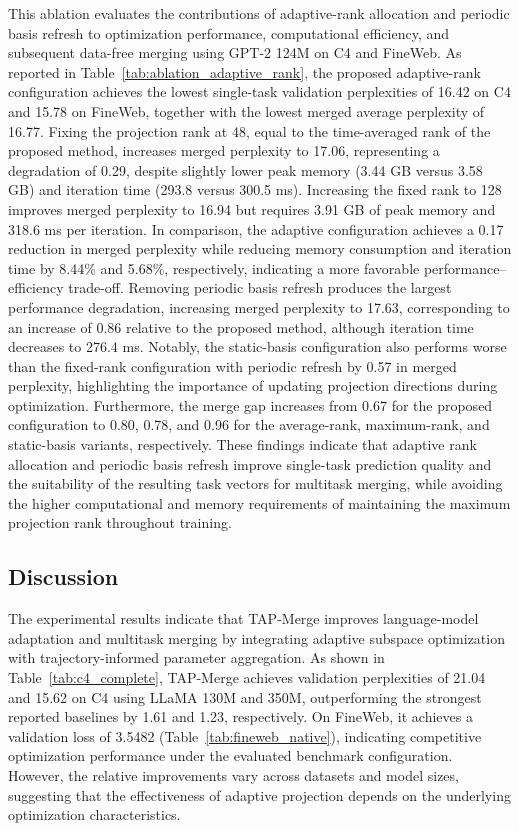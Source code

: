 \documentclass[fleqn,10pt]{wlscirep}
\begin{document}
This ablation evaluates the contributions of adaptive-rank allocation and periodic basis refresh to optimization performance, computational efficiency, and subsequent data-free merging using GPT-2 124M on C4 and FineWeb. As reported in Table~\ref{tab:ablation_adaptive_rank}, the proposed adaptive-rank configuration achieves the lowest single-task validation perplexities of 16.42 on C4 and 15.78 on FineWeb, together with the lowest merged average perplexity of 16.77. Fixing the projection rank at 48, equal to the time-averaged rank of the proposed method, increases merged perplexity to 17.06, representing a degradation of 0.29, despite slightly lower peak memory (3.44 GB versus 3.58 GB) and iteration time (293.8 versus 300.5 ms). Increasing the fixed rank to 128 improves merged perplexity to 16.94 but requires 3.91 GB of peak memory and 318.6 ms per iteration. In comparison, the adaptive configuration achieves a 0.17 reduction in merged perplexity while reducing memory consumption and iteration time by 8.44\% and 5.68\%, respectively, indicating a more favorable performance--efficiency trade-off. Removing periodic basis refresh produces the largest performance degradation, increasing merged perplexity to 17.63, corresponding to an increase of 0.86 relative to the proposed method, although iteration time decreases to 276.4 ms. Notably, the static-basis configuration also performs worse than the fixed-rank configuration with periodic refresh by 0.57 in merged perplexity, highlighting the importance of updating projection directions during optimization. Furthermore, the merge gap increases from 0.67 for the proposed configuration to 0.80, 0.78, and 0.96 for the average-rank, maximum-rank, and static-basis variants, respectively. These findings indicate that adaptive rank allocation and periodic basis refresh improve single-task prediction quality and the suitability of the resulting task vectors for multitask merging, while avoiding the higher computational and memory requirements of maintaining the maximum projection rank throughout training.




\subsection{Discussion}
\label{subsec:discussion}

The experimental results indicate that TAP-Merge improves language-model adaptation and multitask merging by integrating adaptive subspace optimization with trajectory-informed parameter aggregation. As shown in Table~\ref{tab:c4_complete}, TAP-Merge achieves validation perplexities of 21.04 and 15.62 on C4 using LLaMA 130M and 350M, outperforming the strongest reported baselines by 1.61 and 1.23, respectively. On FineWeb, it achieves a validation loss of 3.5482 (Table~\ref{tab:fineweb_native}), indicating competitive optimization performance under the evaluated benchmark configuration. However, the relative improvements vary across datasets and model sizes, suggesting that the effectiveness of adaptive projection depends on the underlying optimization characteristics.
\end{document}
